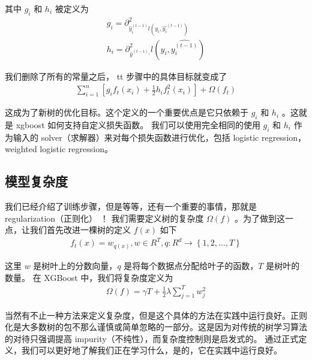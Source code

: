 \documentclass{article}
\begin{document}
其中 $g_i$ 和 $h_i$ 被定义为
\begin{equation*}
	\begin{split}
		g_i = \partial^2_{\hat{y}_i^{(t-1)}l(y_i,\hat{y_i}^{(t-1)})}\\
		h_i = \partial^2_{\hat{y}^{(t-1)_i}}l(y_i,\hat{y_i^{(t-1)}})
	\end{split}
\end{equation*}

我们删除了所有的常量之后， tt 步骤中的具体目标就变成了
\begin{equation*}
	\begin{split}
		\sum_{i=1}^n[g_if_t(x_i)+\frac{1}{2}h_if_t^2(x_i)]+\Omega(f_t)
	\end{split}
\end{equation*}

这成为了新树的优化目标。这个定义的一个重要优点是它只依赖于 $g_i$ 和 $h_i$ 。这就是 xgboost 如何支持自定义损失函数。 我们可以使用完全相同的使用 $g_i$ 和 $h_i$ 作为输入的 solver（求解器）来对每个损失函数进行优化，包括 logistic regression， weighted logistic regression。

\subsection{模型复杂度}
我们已经介绍了训练步骤，但是等等，还有一个重要的事情，那就是 regularization（正则化） ！ 我们需要定义树的复杂度 $\Omega(f)$ 。为了做到这一点，让我们首先改进一棵树的定义 $f(x)$ 如下
\begin{equation*}
	\begin{split}
		f_t(x) = w_{q(x)},w\in R^T,q:R^d\rightarrow\left\{1,2,\ldots,T\right\}
	\end{split}
\end{equation*}

这里 $w$ 是树叶上的分数向量，$q$ 是将每个数据点分配给叶子的函数，$T$ 是树叶的数量。 在 XGBoost 中，我们将复杂度定义为
\begin{equation*}
	\begin{split}
		\Omega(f)=\gamma T+\frac{1}{2}\lambda\sum_{j=1}^Tw^2_j 
	\end{split}
\end{equation*}

当然有不止一种方法来定义复杂度，但是这个具体的方法在实践中运行良好。正则化是大多数树的包不那么谨慎或简单忽略的一部分。这是因为对传统的树学习算法的对待只强调提高 impurity（不纯性），而复杂度控制则是启发式的。 通过正式定义，我们可以更好地了解我们正在学习什么，是的，它在实践中运行良好。
\end{document}
